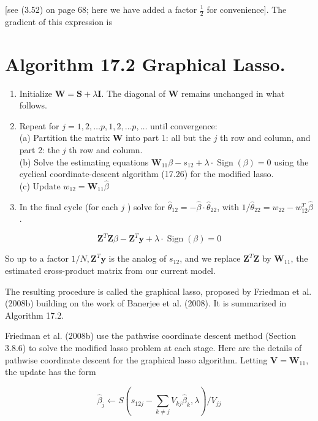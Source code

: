 \documentclass[10pt]{article}
\begin{document}
[see (3.52) on page 68; here we have added a factor $\frac{1}{2}$ for convenience]. The gradient of this expression is

\section*{Algorithm 17.2 Graphical Lasso.}
\begin{enumerate}
  \item Initialize $\mathbf{W}=\mathbf{S}+\lambda \mathbf{I}$. The diagonal of $\mathbf{W}$ remains unchanged in what follows.
  \item Repeat for $j=1,2, \ldots p, 1,2, \ldots p, \ldots$ until convergence:\\
(a) Partition the matrix $\mathbf{W}$ into part 1: all but the $j$ th row and column, and part 2: the $j$ th row and column.\\
(b) Solve the estimating equations $\mathbf{W}_{11} \beta-s_{12}+\lambda \cdot \operatorname{Sign}(\beta)=0$ using the cyclical coordinate-descent algorithm (17.26) for the modified lasso.\\
(c) Update $w_{12}=\mathbf{W}_{11} \hat{\beta}$
  \item In the final cycle (for each $j$ ) solve for $\hat{\theta}_{12}=-\hat{\beta} \cdot \hat{\theta}_{22}$, with $1 / \hat{\theta}_{22}= w_{22}-w_{12}^{T} \hat{\beta}$.
\end{enumerate}


\begin{equation*}
\mathbf{Z}^{T} \mathbf{Z} \beta-\mathbf{Z}^{T} \mathbf{y}+\lambda \cdot \operatorname{Sign}(\beta)=0 \tag{17.25}
\end{equation*}


So up to a factor $1 / N, \mathbf{Z}^{T} \mathbf{y}$ is the analog of $s_{12}$, and we replace $\mathbf{Z}^{T} \mathbf{Z}$ by $\mathbf{W}_{11}$, the estimated cross-product matrix from our current model.

The resulting procedure is called the graphical lasso, proposed by Friedman et al. (2008b) building on the work of Banerjee et al. (2008). It is summarized in Algorithm 17.2.

Friedman et al. (2008b) use the pathwise coordinate descent method (Section 3.8.6) to solve the modified lasso problem at each stage. Here are the details of pathwise coordinate descent for the graphical lasso algorithm. Letting $\mathbf{V}=\mathbf{W}_{11}$, the update has the form


\begin{equation*}
\hat{\beta}_{j} \leftarrow S\left(s_{12 j}-\sum_{k \neq j} V_{k j} \hat{\beta}_{k}, \lambda\right) / V_{j j} \tag{17.26}
\end{equation*}
\end{document}
